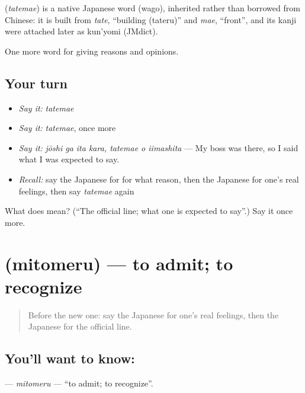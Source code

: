 \begin{cousinweb}
\textbf{} (\emph{tatemae}) is a native Japanese word (wago), inherited rather than borrowed from Chinese: it is built from \emph{tate}, \textquotedblleft{}building (tateru)\textquotedblright{} and \emph{mae}, \textquotedblleft{}front\textquotedblright{}, and its kanji were attached later as kun'yomi (JMdict).
\end{cousinweb}

\begin{grammarlens}[title={What you've built}]
One more word for giving reasons and opinions.
\end{grammarlens}

\subsection*{Your turn}
\begin{itemize}
\raggedright
  \item \emph{Say it:} \emph{tatemae}
  \item \emph{Say it:} \emph{tatemae}, once more
  \item \emph{Say it:} \emph{jōshi ga ita kara, tatemae o iimashita} — My boss was there, so I said what I was expected to say.
  \item \emph{Recall:} say the Japanese for for what reason, then the Japanese for one's real feelings, then say \emph{tatemae} again
\end{itemize}

\begin{tcolorbox}[breakable,colback=teal!4,colframe=teal!35!black,title={Before you move on}]
What does  mean? (\textquotedblleft{}The official line; what one is expected to say\textquotedblright{}.) Say it once more.
\end{tcolorbox}
\section[\texorpdfstring{\ja{みとめる} (mitomeru)}{みとめる (mitomeru)}]{ (mitomeru) — to admit; to recognize}

\label{lesson:JA-C319-mitomeru}



\begin{quote}
Before the new one: say the Japanese for one's real feelings, then the Japanese for the official line.
\end{quote}

\subsection*{You'll want to know: }
\textbf{} — \emph{mitomeru} — \textquotedblleft{}to admit; to recognize\textquotedblright{}.

